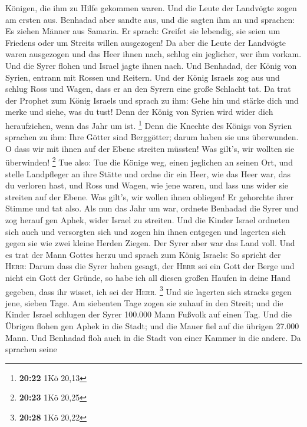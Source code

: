 Königen, die ihm zu Hilfe gekommen waren.  Und die Leute
der Landvögte zogen am ersten aus. Benhadad aber sandte aus, und die
sagten ihm an und sprachen: Es ziehen Männer aus Samaria.
 Er sprach: Greifet sie lebendig, sie seien um Friedens
oder um Streits willen ausgezogen!  Da aber die Leute der
Landvögte waren ausgezogen und das Heer ihnen nach, 
schlug ein jeglicher, wer ihm vorkam. Und die Syrer flohen und Israel
jagte ihnen nach. Und Benhadad, der König von Syrien, entrann mit Rossen
und Reitern.  Und der König Israels zog aus und schlug
Ross und Wagen, dass er an den Syrern eine große Schlacht tat.
 Da trat der Prophet zum König Israels und sprach zu ihm:
Gehe hin und stärke dich und merke und siehe, was du tust! Denn der
König von Syrien wird wider dich heraufziehen, wenn das Jahr um ist.
\footnote{\textbf{20:22} 1Kö 20,13}  Denn die Knechte des
Königs von Syrien sprachen zu ihm: Ihre Götter sind Berggötter; darum
haben sie uns überwunden. O dass wir mit ihnen auf der Ebene streiten
müssten! Was gilt's, wir wollten sie überwinden! \footnote{\textbf{20:23}
  1Kö 20,25}  Tue also: Tue die Könige weg, einen
jeglichen an seinen Ort, und stelle Landpfleger an ihre Stätte
 und ordne dir ein Heer, wie das Heer war, das du
verloren hast, und Ross und Wagen, wie jene waren, und lass uns wider
sie streiten auf der Ebene. Was gilt's, wir wollen ihnen obliegen! Er
gehorchte ihrer Stimme und tat also.  Als nun das Jahr um
war, ordnete Benhadad die Syrer und zog herauf gen Aphek, wider Israel
zu streiten.  Und die Kinder Israel ordneten sich auch
und versorgten sich und zogen hin ihnen entgegen und lagerten sich gegen
sie wie zwei kleine Herden Ziegen. Der Syrer aber war das Land voll.
 Und es trat der Mann Gottes herzu und sprach zum König
Israels: So spricht der \textsc{Herr}: Darum dass die Syrer haben
gesagt, der \textsc{Herr} sei ein Gott der Berge und nicht ein Gott der
Gründe, so habe ich all diesen großen Haufen in deine Hand gegeben, dass
ihr wisset, ich sei der \textsc{Herr}. \footnote{\textbf{20:28} 1Kö
  20,22}  Und sie lagerten sich stracks gegen jene,
sieben Tage. Am siebenten Tage zogen sie zuhauf in den Streit; und die
Kinder Israel schlugen der Syrer 100.000 Mann Fußvolk auf einen Tag.
 Und die Übrigen flohen gen Aphek in die Stadt; und die
Mauer fiel auf die übrigen 27.000 Mann. Und Benhadad floh auch in die
Stadt von einer Kammer in die andere.  Da sprachen seine
